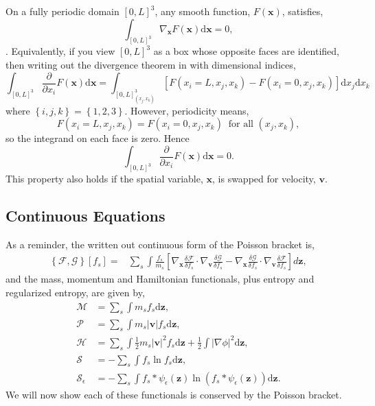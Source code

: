\documentclass[preprint,12pt]{elsarticle}
\theoremstyle{definition}
\begin{document}
On a fully periodic domain $\left[0,L\right]^3$, any smooth function, $F(\boldsymbol{x})$, satisfies,
\begin{equation}
  \int_{\left[0,L\right]^3} \nabla_{\boldsymbol{x}} F(\boldsymbol{x}) \mathrm{d} \boldsymbol{x} = 0,
\end{equation}
\cite{Heath2012,Perin2014}. Equivalently, if you view $\left[0,L\right]^3$ as a box whose opposite faces are identified, then writing out the divergence theorem in with dimensional indices,
\begin{equation*}
  \int_{\left[0,L\right]^3} \frac{\partial}{\partial x_i} F(\boldsymbol{x}) \mathrm{d} \boldsymbol{x} = \int_{\left[0,L\right]^3_{(x_j,x_k)}} \left[F(x_i=L,x_j,x_k) - F(x_i=0,x_j,x_k)\right] \mathrm{d} x_j \mathrm{d} x_k
\end{equation*}
where $\left\{i,j,k\right\}=\left\{1,2,3\right\}$. However, periodicity means, 
\begin{equation*}
  F(x_i=L,x_j,x_k) = F(x_i=0,x_j,x_k)\;\;\text{for all }(x_j,x_k),
\end{equation*}
so the integrand on each face is zero. Hence
\begin{equation}
  \int_{\left[0,L\right]^3} \frac{\partial}{\partial x_i} F(\boldsymbol{x}) \mathrm{d} \boldsymbol{x} = 0.
\end{equation}
This property also holds if the spatial variable, $\boldsymbol{x}$, is swapped for velocity, $\boldsymbol{v}$.

\subsection{Continuous Equations}
As a reminder, the written out continuous form of the Poisson bracket is,
\begin{align*}
  \left\{\mathcal{F},\mathcal{G}\right\} \left[f_s\right] = &\sum_s \int \frac{f_s}{m_s} \left[\nabla_{\boldsymbol{x}} \frac{\delta \mathcal{F}}{\delta f_s} \cdot \nabla_{\boldsymbol{v}} \frac{\delta \mathcal{G}}{\delta f_s} - \nabla_{\boldsymbol{x}} \frac{\delta \mathcal{G}}{\delta f_s} \cdot \nabla_{\boldsymbol{v}} \frac{\delta \mathcal{F}}{\delta f_s} \right] d\boldsymbol{z},
\end{align*}
and the mass, momentum and Hamiltonian functionals, plus entropy and regularized entropy, are given by,
\begin{align*}
    \mathcal{M} &= \sum_s \int  m_s  f_s \mathrm{d} \boldsymbol{z},\\
    \mathcal{P} &= \sum_s \int  m_s |\boldsymbol{v}| f_s \mathrm{d} \boldsymbol{z},\\
    \mathcal{H} &= \sum_s \int \frac{1}{2} m_s |\boldsymbol{v}|^2 f_s \mathrm{d} \boldsymbol{z} + \frac{1}{2} \int |\nabla \phi|^2 \mathrm{d} \boldsymbol{z}, \\
    \mathcal{S} &= - \sum_s \int f_s \ln f_s \mathrm{d} \boldsymbol{z},\\
    \mathcal{S}_\epsilon &=-\sum_s \int f_s \ast \psi_{\epsilon}\left(\boldsymbol{z}\right) \ln \left(f_s \ast \psi_{\epsilon}\left(\boldsymbol{z}\right)\right) \mathrm{d} \boldsymbol{z}. 
\end{align*}
We will now show each of these functionals is conserved by the Poisson bracket.
\end{document}
